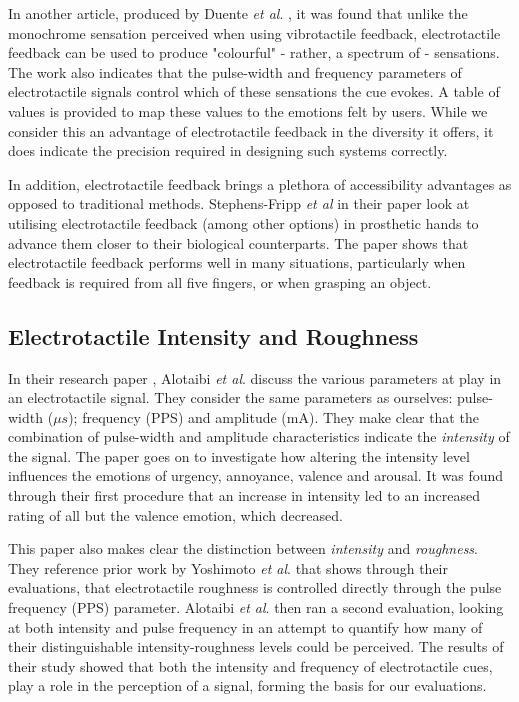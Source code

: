 \documentclass{mpaper}
\begin{document}
In another article, produced by Duente \emph{et al}. \cite{duente2023colorful}, it was found that unlike the monochrome sensation perceived when using vibrotactile feedback, electrotactile feedback can be used to produce "colourful" - rather, a spectrum of - sensations. The work also indicates that the pulse-width and frequency parameters of electrotactile signals control which of these sensations the cue evokes. A table of values is provided to map these values to the emotions felt by users. While we consider this an advantage of electrotactile feedback in the diversity it offers, it does indicate the precision required in designing such systems correctly.

In addition, electrotactile feedback brings a plethora of accessibility advantages as opposed to traditional methods. Stephens-Fripp \emph{et al} in their paper \cite{Stephens-Fripp} look at utilising electrotactile feedback (among other options) in prosthetic hands to advance them closer to their biological counterparts. The paper shows that electrotactile feedback performs well in many situations, particularly when feedback is required from all five fingers, or when grasping an object. 

\pagebreak
\subsection{Electrotactile Intensity and Roughness}
In their research paper \cite{10.1145/3491102.3501863}, Alotaibi \emph{et al}. discuss the various parameters at play in an electrotactile signal. They consider the same parameters as ourselves: pulse-width (${\mu}s$); frequency (PPS) and amplitude (mA). They make clear that the combination of pulse-width and amplitude characteristics indicate the \emph{intensity} of the signal. The paper goes on to investigate how altering the intensity level influences the emotions of urgency, annoyance, valence and arousal. It was found through their first procedure that an increase in intensity led to an increased rating of all but the valence emotion, which decreased.

This paper \cite{10.1145/3491102.3501863} also makes clear the distinction between \emph{intensity} and \emph{roughness}. They reference prior work by Yoshimoto \emph{et al}. \cite{yoshimoto} that shows through their evaluations, that electrotactile roughness is controlled directly through the pulse frequency (PPS) parameter. Alotaibi \emph{et al}. \cite{10.1145/3491102.3501863} then ran a second evaluation, looking at both intensity and pulse frequency in an attempt to quantify how many of their distinguishable intensity-roughness levels could be perceived. The results of their study showed that both the intensity and frequency of electrotactile cues, play a role in the perception of a signal, forming the basis for our evaluations.\\
\end{document}
